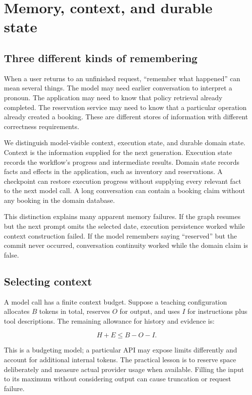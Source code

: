 \chapter{Memory, context, and durable state}
\section{Three different kinds of remembering}
When a user returns to an unfinished request, “remember what happened” can mean several things. The model may need earlier conversation to interpret a pronoun. The application may need to know that policy retrieval already completed. The reservation service may need to know that a particular operation already created a booking. These are different stores of information with different correctness requirements.

We distinguish model-visible context, execution state, and durable domain state. Context is the information supplied for the next generation. Execution state records the workflow's progress and intermediate results. Domain state records facts and effects in the application, such as inventory and reservations. A checkpoint can restore execution progress without supplying every relevant fact to the next model call. A long conversation can contain a booking claim without any booking in the domain database.

This distinction explains many apparent memory failures. If the graph resumes but the next prompt omits the selected date, execution persistence worked while context construction failed. If the model remembers saying “reserved” but the commit never occurred, conversation continuity worked while the domain claim is false.

\section{Selecting context}
A model call has a finite context budget. Suppose a teaching configuration allocates \(B\) tokens in total, reserves \(O\) for output, and uses \(I\) for instructions plus tool descriptions. The remaining allowance for history and evidence is:

\begin{equation}
H+E\leq B-O-I.
\end{equation}

This is a budgeting model; a particular API may expose limits differently and account for additional internal tokens. The practical lesson is to reserve space deliberately and measure actual provider usage when available. Filling the input to its maximum without considering output can cause truncation or request failure.

